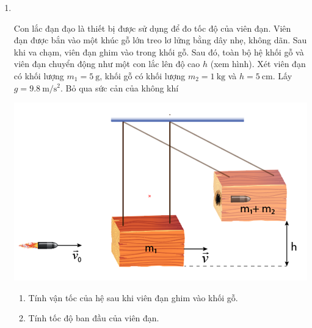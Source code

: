 \begin{enumerate}[label=\bfseries Câu \arabic*:, leftmargin=1.5cm]
\item {}\\
{Con lắc đạn đạo là thiết bị được sử dụng để đo tốc độ của viên đạn. Viên đạn được bắn vào một khúc gỗ lớn treo lơ lửng bằng dây nhẹ, không dãn. Sau khi va chạm, viên đạn ghim vào trong khối gỗ. Sau đó, toàn bộ hệ khối gỗ và viên đạn chuyển động như một con lắc lên độ cao $h$ (xem hình). Xét viên đạn có khối lượng $m_1=\SI{5}{\gram}$, khối gỗ có khối lượng $m_2=\SI{1}{\kilogram}$ và  $h=\SI{5}{\centi\meter}$. Lấy $g=\SI{9.8}{\meter/\second^2}$. Bỏ qua sức cản của không khí
	\begin{center}
		\includegraphics[width=0.35\linewidth]{../figs/VN10-2023-PH-TP030-P-2}
	\end{center}
\begin{enumerate}[label=\alph*)]
	\item Tính vận tốc của hệ sau khi viên đạn ghim vào khối gỗ.
	\item Tính tốc độ ban đầu của viên đạn.
\end{enumerate}
}


\end{enumerate}
